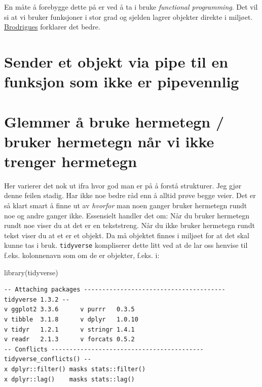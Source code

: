 \documentclass[
  letterpaper,
  DIV=11,
  numbers=noendperiod]{scrreprt}
\newenvironment{Shaded}{\begin{snugshade}}{\end{snugshade}}
\newcommand{\FunctionTok}[1]{\textcolor[rgb]{0.28,0.35,0.67}{#1}}
\newcommand{\NormalTok}[1]{\textcolor[rgb]{0.00,0.23,0.31}{#1}}
\begin{document}
En måte å forebygge dette på er ved å ta i bruke \emph{functional
programming}. Det vil si at vi bruker funksjoner i stor grad og sjelden
lagrer objekter direkte i miljøet.
\href{https://www.brodrigues.co/blog/2022-05-26-safer_programs/}{Brodrigues}
forklarer det bedre.

\hypertarget{sender-et-objekt-via-pipe-til-en-funksjon-som-ikke-er-pipevennlig}{%
\section{Sender et objekt via pipe til en funksjon som ikke er
pipevennlig}\label{sender-et-objekt-via-pipe-til-en-funksjon-som-ikke-er-pipevennlig}}

\hypertarget{glemmer-uxe5-bruke-hermetegn-bruker-hermetegn-nuxe5r-vi-ikke-trenger-hermetegn}{%
\section{Glemmer å bruke hermetegn / bruker hermetegn når vi ikke
trenger
hermetegn}\label{glemmer-uxe5-bruke-hermetegn-bruker-hermetegn-nuxe5r-vi-ikke-trenger-hermetegn}}

Her varierer det nok ut ifra hvor god man er på å forstå strukturer. Jeg
gjør denne feilen stadig. Har ikke noe bedre råd enn å alltid prøve
begge veier. Det er så klart smart å finne ut av \emph{hvorfor} man noen
ganger bruker hermetegn rundt noe og andre ganger ikke. Essensielt
handler det om: Når du bruker hermetegn rundt noe viser du at det er en
tekststreng. Når du ikke bruker hermetegn rundt tekst viser du at et er
et objekt. Da må objektet finnes i miljøet for at det skal kunne tas i
bruk. \texttt{tidyverse} kompliserer dette litt ved at de lar oss
henvise til f.eks. kolonnenavn som om de er objekter, f.eks. i:

\begin{Shaded}
\begin{Highlighting}[]
\FunctionTok{library}\NormalTok{(tidyverse)}
\end{Highlighting}
\end{Shaded}

\begin{verbatim}
-- Attaching packages --------------------------------------- tidyverse 1.3.2 --
v ggplot2 3.3.6      v purrr   0.3.5 
v tibble  3.1.8      v dplyr   1.0.10
v tidyr   1.2.1      v stringr 1.4.1 
v readr   2.1.3      v forcats 0.5.2 
-- Conflicts ------------------------------------------ tidyverse_conflicts() --
x dplyr::filter() masks stats::filter()
x dplyr::lag()    masks stats::lag()
\end{verbatim}
\end{document}
